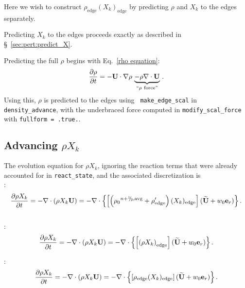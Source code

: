 Here we wish to construct $\rho_\mathrm{edge} (X_k)_\mathrm{edge}$
by predicting $\rho$ and $X_k$ to the edges separately.

Predicting $X_k$ to the edges proceeds exactly as described in
\S~\ref{sec:pert:predict_X}.  

Predicting the full $\rho$ begins with Eq.~\ref{rho equation}:
\begin{equation}
\frac{\partial\rho}{\partial t} 
= -{\bf U}\cdot\nabla\rho \, \underbrace{- \rho\nabla\cdot{\bf U}}_{``\rho~\text{force''}} \, . \label{rho equation labeled}
\end{equation}
Using this, $\rho$ is predicted to the edges using {\tt
  make\_edge\_scal} in {\tt density\_advance}, with the underbraced
force computed in {\tt modify\_scal\_force} with {\tt fullform =
  .true.}.

\subsection{Advancing $\rho X_k$}\label{Advancing rhoX_k}
The evolution equation for $\rho X_k$, ignoring the reaction terms
that were already accounted for in {\tt react\_state}, and the
associated discretization is \\

:
\begin{equation}
\frac{\partial\rho X_k}{\partial t} = -\nabla\cdot(\rho X_k\Ub) = 
-\nabla\cdot\left\{\left[\left({\rho_0}^{n+\myhalf,{\rm avg}}
+ \rho'_\mathrm{edge} \right)(X_k)_\mathrm{edge} \right](\Ubt+w_0\eb_r)\right\}.
\end{equation} \\


:
\begin{equation}
\frac{\partial\rho X_k}{\partial t} = -\nabla\cdot(\rho X_k{\bf U}) = 
-\nabla\cdot\left\{\left[\left(\rho X_k \right)_\mathrm{edge} \right](\widetilde{{\bf U}}+w_0{\bf e}_r)\right\}.
\end{equation}


:
\begin{equation}
\frac{\partial\rho X_k}{\partial t} = -\nabla\cdot(\rho X_k{\bf U}) = 
-\nabla\cdot\left\{\left[\rho_\mathrm{edge} (X_k)_\mathrm{edge} \right](\widetilde{{\bf U}}+w_0{\bf e}_r)\right\}.
\end{equation}


